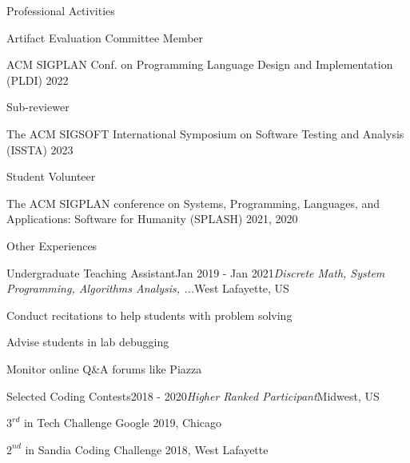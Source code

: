 \documentclass{resume} %
\begin{document}
\begin{rSection}{Professional Activities}

\begin{rSubsection}{Artifact Evaluation Committee Member}{}{}{}
    \item ACM SIGPLAN Conf. on Programming Language Design and Implementation (PLDI) 2022
\end{rSubsection}

\begin{rSubsection}{Sub-reviewer}{}{}{}
    \item The ACM SIGSOFT International Symposium on Software Testing and Analysis (ISSTA) 2023
\end{rSubsection}

\begin{rSubsection}{Student Volunteer}{}{}{}
    \item The ACM SIGPLAN conference on Systems, Programming, Languages, and Applications: Software for Humanity (SPLASH) 2021, 2020
\end{rSubsection}

\end{rSection}

\begin{rSection}{ Other Experiences}

\begin{rSubsection}{Undergraduate Teaching Assistant}{Jan 2019 - Jan 2021}{\textit{Discrete Math, System Programming, Algorithms Analysis, ...}}{West Lafayette, US}
\item Conduct recitations to help students with problem solving
\item Advise students in lab debugging
\item Monitor online Q\&A forums like Piazza
\end{rSubsection}

\begin{rSubsection}{Selected Coding Contests}{2018 - 2020}{\it Higher Ranked Participant}{Midwest, US}
\item $3^{rd}$ in Tech Challenge Google 2019, Chicago
\item $2^{nd}$ in Sandia Coding Challenge 2018, West Lafayette

\end{rSubsection}


\end{rSection}

\end{document}
